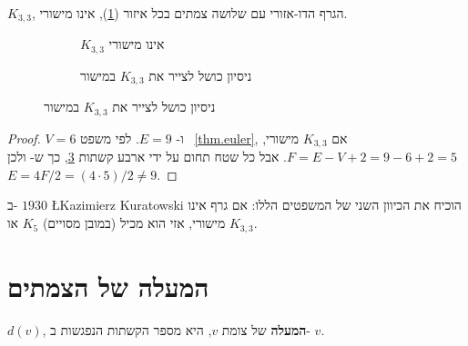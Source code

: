 \begin{theorem}
$K_{3,3}$,
הגרף הדו-אזורי עם שלושה צמתים בכל איזור 
(\ref{f.five-k33}),
אינו מישורי.
\end{theorem}
\begin{figure}[tb]
\begin{center}
\begin{subfigure}{.4\textwidth}
\caption{$K_{3,3}$ אינו מישורי}\label{f.five-k33}
\end{subfigure}
\hspace{3em}
\begin{subfigure}{.4\textwidth}
\caption{ניסיון כושל לצייר את
$K_{3,3}$
במישור}
\label{f.five-k33-failed}
\end{subfigure}
\end{center}
\end{figure}
\begin{proof}
$V=6$
ו-%
$E=9$.
לפי משפט%
~\ref{thm.euler},
אם
$K_{3,3}$
מישורי,
$F=E-V+2=9-6+2=5$.
אבל כל שטח תחום על ידי ארבע קשתות
\ref{f.five-k33-failed},
כך ש-
 ולכן
$E=4F/2=(4\cdot 5)/2\neq 9$.
\end{proof}

ב-%
$1930$
\L{Kazimierz Kuratowski}
הוכיח את הכיוון השני של המשפטים הללו: אם גרף אינו מישורי, אזי הוא מכיל (במובן מסויים) 
$K_5$
או
$K_{3,3}$.


\section{המעלה של הצמתים}\label{s.degrees}

\begin{definition}
$d(v)$,
\textbf{המעלה}
של צומת
$v$,
היא מספר הקשתות הנפגשות ב-%
$v$.
\end{definition}

